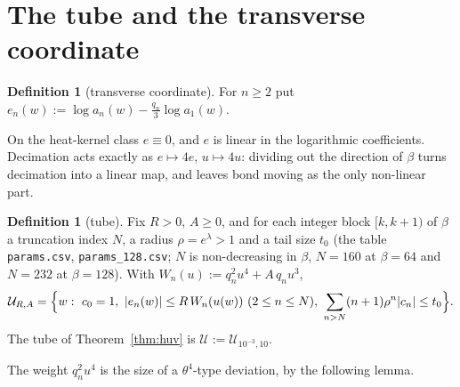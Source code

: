 \documentclass[11pt,a4paper]{article}
\theoremstyle{definition}
\newtheorem{definition}[theorem]{Definition}
\theoremstyle{remark}
\newcommand{\code}[1]{\texttt{#1}}
\newcommand{\cU}{\mathcal{U}}
\begin{document}
\section{The tube and the transverse coordinate}\label{sec:tube}

\begin{definition}[transverse coordinate]
For $n\ge2$ put $e_n(w):=\log a_n(w)-\tfrac{q_n}{3}\log a_1(w)$.
\end{definition}
On the heat-kernel class $e\equiv0$, and $e$ is linear in the logarithmic coefficients.
Decimation acts exactly as $e\mapsto 4e$, $u\mapsto 4u$: dividing out the direction of $\beta$ turns decimation into a linear map, and leaves bond moving as the only non-linear part.

\begin{definition}[tube]\label{def:tube}
Fix $R>0$, $A\ge0$, and for each integer block $[k,k+1)$ of $\beta$ a truncation index $N$, a radius $\rho=e^{\lambda}>1$ and a tail size $t_0$ (the table \code{params.csv}, \code{params\_128.csv}; $N$ is non-decreasing in $\beta$, $N=160$ at $\beta=64$ and $N=232$ at $\beta=128$).
With $W_n(u):=q_n^2u^4+A\,q_nu^3$,
\[
\cU_{R,A}=\Bigl\{w:\ c_0=1,\ |e_n(w)|\le R\,W_n(u(w))\ (2\le n\le N),\ \sum_{n>N}(n+1)\rho^n|c_n|\le t_0\Bigr\}.
\]
The tube of Theorem~\ref{thm:huv} is $\cU:=\cU_{10^{-3},10}$.
\end{definition}
The weight $q_n^2u^4$ is the size of a $\theta^4$-type deviation, by the following lemma.
\end{document}
